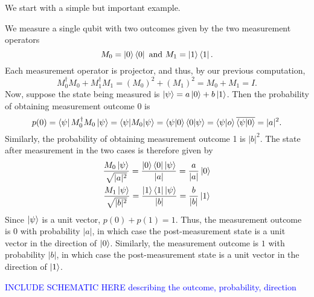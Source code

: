 {We start with a simple but important example.
\begin{example} \label{measurement-standard basis}
We measure a single qubit with two outcomes given by the two measurement operators 
$$M_0=\ket{0}\bra{0}\textrm{ and }M_1=\ket{1}\bra{1}.$$ 
Each measurement operator is projector, and thus, by our previous computation,
\begin{equation*}
    M_0^\dagger M_0+M_1^\dagger M_1 = (M_0)^2+(M_1)^2=M_0 + M_1 = I.
\end{equation*}
Now, suppose the state being measured is $\ket{\psi}=a\ket{0}+b\ket{1}$. Then the probability of obtaining measurement outcome 0 is
\begin{equation*}
    p(0) = \bra{\psi}M_0^\dagger M_0 \ket{\psi} = \braket{\psi | M_0 | \psi}=\braket{\psi|0}\braket{0|\psi}=\braket{\psi|o}\overline{\braket{\psi|0}}=|a|^2.
\end{equation*}
Similarly, the probability of obtaining measurement outcome 1 is $|b|^2$.
The state after measurement in the two cases is therefore given by
\begin{gather*}
    \frac{M_0 \ket{\psi}}{\sqrt{|a|^2}}=\frac{\ket{0}\bra{0}\ket{\psi}}{|a|}=\frac{a}{|a|}\ket{0}\\
    \frac{M_1 \ket{\psi}}{\sqrt{|b|^2}}=\frac{\ket{1}\bra{1}\ket{\psi}}{|b|}=\frac{b}{|b|}\ket{1}\\   
\end{gather*}
Since $\ket{\psi}$ is a unit vector, $p(0)+p(1)=1$.  Thus, the measurement outcome is $0$ with probability $|a|$, in which case the post-measurement state is a unit vector in the direction of $\ket{0}$.  Similarly, the measurement outcome is $1$ with probability $|b|$, in which case the post-measurement state is a unit vector in the direction of $\ket{1}$.
\end{example}

\textcolor{blue}{INCLUDE SCHEMATIC HERE describing the outcome, probability, direction}



}
